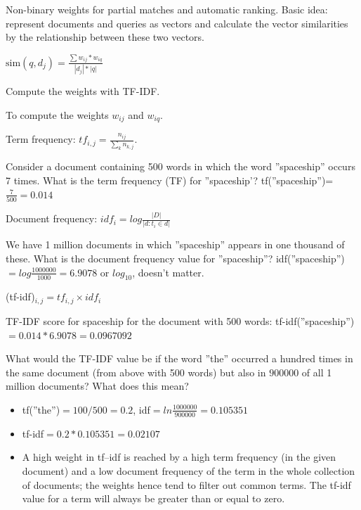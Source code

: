 \begin{breakbox}

Non-binary weights for partial matches and automatic ranking. Basic idea: represent documents and queries as vectors and calculate the vector similarities by the relationship between these two vectors. 

\begin{center}
	$\text{sim}(q, d_j) = \frac{\sum w_{ij}*w_{iq}}{|d_j| * |q|}$
\end{center}
Compute the weights with TF-IDF.
\end{breakbox}

\begin{breakbox}

To compute the weights $w_{ij}$ and $w_{iq}$.

\begin{center}
	Term frequency: $tf_{i,j} = \frac{n_{ij}}{\sum_{k}{} n_{k,j}}$. 
\end{center}

Consider a document containing 500 words in which the word ''spaceship'' occurs 7 times. What is the term frequency (TF) for ''spaceship'? tf(''spaceship'')=$\frac{7}{500} = 0.014$

\begin{center}
	Document frequency: $idf_i = log \frac{|D|}{|{d:t_i \in d}|}$
\end{center}

We have 1 million documents in which ''spaceship'' appears in one thousand of these. What is the document frequency value for ''spaceship''? idf(''spaceship'')$=log\frac{1000000}{1000}=6.9078$ or $log_{10}$, doesn't matter.

\begin{center}
	(tf-idf)$_{i,j}	= tf_{i,j} \times idf_i$
\end{center}
TF-IDF score for spaceship for the document with 500 words: tf-idf(''spaceship'')$=0.014*6.9078=0.0967092$

What would the TF-IDF value be if the word ''the'' occurred a hundred times in the same document (from above with 500 words) but also in $900000$ of all 1 million documents? What does this mean?

\begin{itemize}
	\item tf(''the'')$=100/500=0.2$, idf$=ln\frac{1000000}{900000}=0.105351$
	\item tf-idf$=0.2*0.105351=0.02107$
	\item A high weight in tf–idf is reached by a high term frequency (in the given document) and a low document frequency of the term in the whole collection of documents; the weights
hence tend to filter out common terms. The tf-idf value for a term will always be greater than or equal to zero.
\end{itemize}
\end{breakbox}